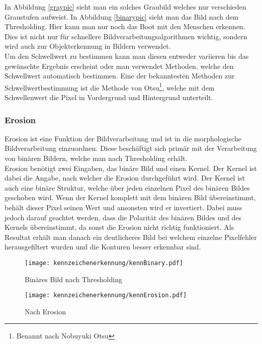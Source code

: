 In Abbildung \ref{graypic} sieht man ein solches Graubild welches nur verschieden Graustufen aufweist. In Abbildung \ref{binarypic} sieht man das 
Bild nach dem Thresholding. Hier kann man nur noch das Boot mit den Menschen erkennen. Dies ist nicht nur für schnellere 
Bildverarbeitungsalgorithmen wichtig, sondern wird auch zur Objekterkennung in Bildern verwendet.\\

Um den Schwellwert zu bestimmen kann man diesen entweder variieren bis das gewünschte Ergebnis erscheint oder man 
verwendet Methoden, welche den Schwellwert automatisch bestimmen. Eine der bekanntesten Methoden zur Schwellwertbestimmung 
ist die Methode von Otsu\footnote{Benannt nach Nobuyuki Otsu}, welche mit dem Schwellenwert die Pixel in Vordergrund und Hintergrund unterteilt.

\subsubsection{Erosion}
Erosion ist eine Funktion der Bildverarbeitung und ist in die morphologische Bildverarbeitung einzuordnen. Diese beschäftigt 
sich primär mit der Verarbeitung von binären Bildern, welche man nach Thresholding erhält.\\

Erosion benötigt zwei Eingaben, das binäre Bild und einen Kernel. Der Kernel ist dabei die Angabe, nach welcher die Erosion 
durchgeführt wird. Der Kernel ist auch eine binäre Struktur, welche über jeden einzelnen Pixel des binären Bildes geschoben 
wird. Wenn der Kernel komplett mit dem binären Bild übereinstimmt, behält dieser Pixel seinen Wert und ansonsten wird er 
invertiert. Dabei muss jedoch darauf geachtet werden, dass die Polarität des binären Bildes und des Kernels übereinstimmt, 
da sonst die Erosion nicht richtig funktioniert. Als Resultat erhält man danach ein deutlicheres Bild bei welchem einzelne 
Pixelfehler herausgefiltert wurden und die Konturen besser erkennbar sind.\\

\begin{figure}[htbp]
    \centering
    \begin{minipage}[t]{0.45\linewidth}
        \centering
        \texttt{[image: kennzeichenerkennung/kennBinary.pdf]}
        \caption{Binäres Bild nach Thresholding}
        \label{kennbinpic}
    \end{minipage}
    \hfill
    \begin{minipage}[t]{0.45\linewidth}
        \centering
        \texttt{[image: kennzeichenerkennung/kennErosion.pdf]}
        \caption{Nach Erosion}
        \label{eropic}
    \end{minipage}
\end{figure}

